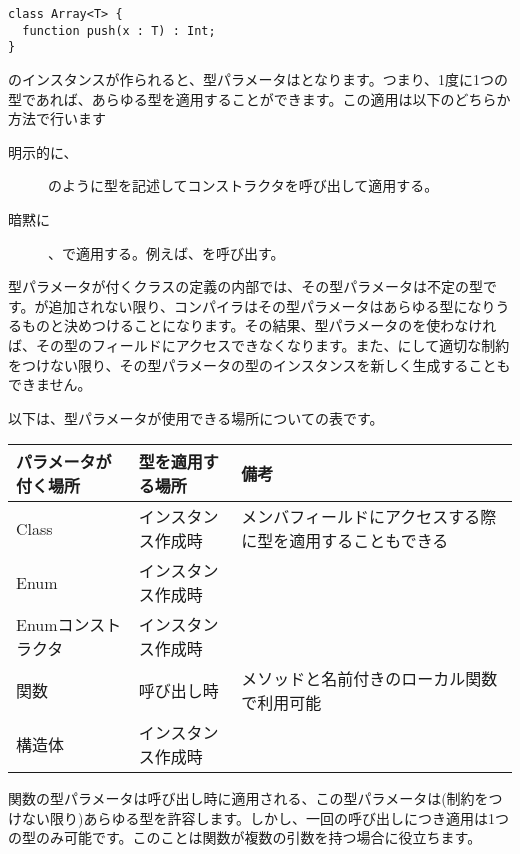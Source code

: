 \begin{lstlisting}
class Array<T> {
  function push(x : T) : Int;
}
\end{lstlisting}
のインスタンスが作られると、型パラメータはとなります。つまり、1度に1つの型であれば、あらゆる型を適用することができます。この適用は以下のどちらか方法で行います

\begin{description}
	\item[明示的に、]のように型を記述してコンストラクタを呼び出して適用する。
	\item[暗黙に]、で適用する。例えば、を呼び出す。
\end{description}

型パラメータが付くクラスの定義の内部では、その型パラメータは不定の型です。が追加されない限り、コンパイラはその型パラメータはあらゆる型になりうるものと決めつけることになります。その結果、型パラメータのを使わなければ、その型のフィールドにアクセスできなくなります。また、にして適切な制約をつけない限り、その型パラメータの型のインスタンスを新しく生成することもできません。

以下は、型パラメータが使用できる場所についての表です。

\begin{center}
\begin{tabular}{| l | l | l |}
	\hline
	パラメータが付く場所 & 型を適用する場所 & 備考 \\ \hline
	Class & インスタンス作成時 & メンバフィールドにアクセスする際に型を適用することもできる \\
	Enum & インスタンス作成時 & \\
	Enumコンストラクタ & インスタンス作成時 & \\
	関数 & 呼び出し時 & メソッドと名前付きのローカル関数で利用可能	\\
	構造体 & インスタンス作成時 & \\ \hline
\end{tabular}
\end{center}

関数の型パラメータは呼び出し時に適用される、この型パラメータは(制約をつけない限り)あらゆる型を許容します。しかし、一回の呼び出しにつき適用は1つの型のみ可能です。このことは関数が複数の引数を持つ場合に役立ちます。

